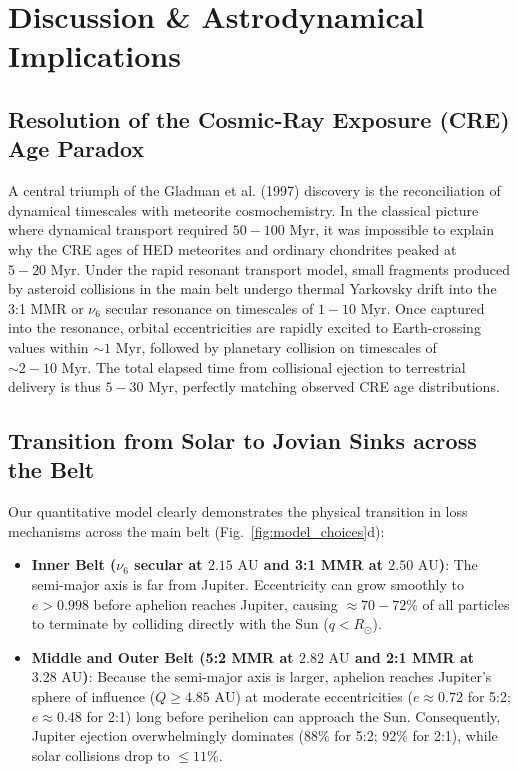 \documentclass[11pt,a4paper]{article}
\begin{document}
\section{Discussion \& Astrodynamical Implications}

\subsection{Resolution of the Cosmic-Ray Exposure (CRE) Age Paradox}
A central triumph of the Gladman et al. (1997) discovery is the reconciliation of dynamical timescales with meteorite cosmochemistry. In the classical picture where dynamical transport required $50-100\text{ Myr}$, it was impossible to explain why the CRE ages of HED meteorites and ordinary chondrites peaked at $5-20\text{ Myr}$. Under the rapid resonant transport model, small fragments produced by asteroid collisions in the main belt undergo thermal Yarkovsky drift into the 3:1 MMR or $\nu_6$ secular resonance on timescales of $1-10\text{ Myr}$. Once captured into the resonance, orbital eccentricities are rapidly excited to Earth-crossing values within $\sim 1\text{ Myr}$, followed by planetary collision on timescales of $\sim 2-10\text{ Myr}$. The total elapsed time from collisional ejection to terrestrial delivery is thus $5-30\text{ Myr}$, perfectly matching observed CRE age distributions.

\subsection{Transition from Solar to Jovian Sinks across the Belt}
Our quantitative model clearly demonstrates the physical transition in loss mechanisms across the main belt (Fig.~\ref{fig:model_choices}d):
\begin{itemize}
    \item \textbf{Inner Belt ($\nu_6$ secular at $2.15\text{ AU}$ and 3:1 MMR at $2.50\text{ AU}$)}: The semi-major axis is far from Jupiter. Eccentricity can grow smoothly to $e > 0.998$ before aphelion reaches Jupiter, causing $\approx 70-72\%$ of all particles to terminate by colliding directly with the Sun ($q < R_\odot$).
    \item \textbf{Middle and Outer Belt (5:2 MMR at $2.82\text{ AU}$ and 2:1 MMR at $3.28\text{ AU}$)}: Because the semi-major axis is larger, aphelion reaches Jupiter's sphere of influence ($Q \ge 4.85\text{ AU}$) at moderate eccentricities ($e \approx 0.72$ for 5:2; $e \approx 0.48$ for 2:1) long before perihelion can approach the Sun. Consequently, Jupiter ejection overwhelmingly dominates ($88\%$ for 5:2; $92\%$ for 2:1), while solar collisions drop to $\le 11\%$.
\end{itemize}
\end{document}
